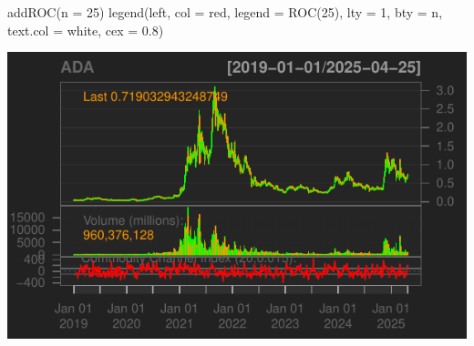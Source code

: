 \documentclass[]{tufte-handout}
\newenvironment{Shaded}{}{}
\newcommand{\AttributeTok}[1]{\textcolor[rgb]{0.49,0.56,0.16}{#1}}
\newcommand{\DecValTok}[1]{\textcolor[rgb]{0.25,0.63,0.44}{#1}}
\newcommand{\FloatTok}[1]{\textcolor[rgb]{0.25,0.63,0.44}{#1}}
\newcommand{\FunctionTok}[1]{\textcolor[rgb]{0.02,0.16,0.49}{#1}}
\newcommand{\NormalTok}[1]{#1}
\newcommand{\StringTok}[1]{\textcolor[rgb]{0.25,0.44,0.63}{#1}}
\begin{document}
\begin{Shaded}
\begin{Highlighting}[]
\FunctionTok{addROC}\NormalTok{(}\AttributeTok{n =} \DecValTok{25}\NormalTok{)}
\FunctionTok{legend}\NormalTok{(}\StringTok{\textquotesingle{}left\textquotesingle{}}\NormalTok{, }\AttributeTok{col =} \StringTok{\textquotesingle{}red\textquotesingle{}}\NormalTok{, }\AttributeTok{legend =} \StringTok{\textquotesingle{}ROC(25)\textquotesingle{}}\NormalTok{, }\AttributeTok{lty =} \DecValTok{1}\NormalTok{, }\AttributeTok{bty =} \StringTok{\textquotesingle{}n\textquotesingle{}}\NormalTok{,}
       \AttributeTok{text.col =} \StringTok{\textquotesingle{}white\textquotesingle{}}\NormalTok{, }\AttributeTok{cex =} \FloatTok{0.8}\NormalTok{)}
\end{Highlighting}
\end{Shaded}

\includegraphics{cripto_update_files/figure-latex/unnamed-chunk-11-10}


\end{document}
